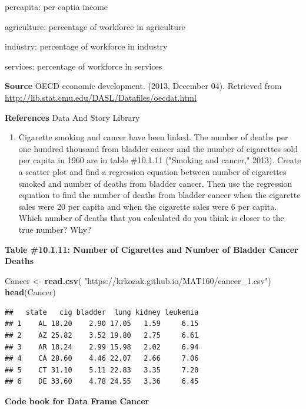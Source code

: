 \documentclass[
]{book}
\newenvironment{Shaded}{\begin{snugshade}}{\end{snugshade}}
\newcommand{\KeywordTok}[1]{\textcolor[rgb]{0.13,0.29,0.53}{\textbf{#1}}}
\newcommand{\NormalTok}[1]{#1}
\newcommand{\StringTok}[1]{\textcolor[rgb]{0.31,0.60,0.02}{#1}}
\providecommand{\tightlist}{%
  \setlength{\itemsep}{0pt}\setlength{\parskip}{0pt}}
\begin{document}
percapita: per captia income

agriculture: percentage of workforce in agriculture

industry: percentage of workforce in industry

services: percentage of workforce in services

\textbf{Source}
OECD economic development. (2013, December 04). Retrieved from
\url{http://lib.stat.cmu.edu/DASL/Datafiles/oecdat.html}

\textbf{References}
Data And Story Library

\begin{enumerate}
\def\labelenumi{\arabic{enumi}.}
\setcounter{enumi}{8}
\tightlist
\item
  Cigarette smoking and cancer have been linked. The number of deaths per one hundred thousand from bladder cancer and the number of cigarettes sold per capita in 1960 are in table \#10.1.11 ("Smoking and cancer," 2013). Create a scatter plot and find a regression equation between number of cigarettes smoked and number of deaths from bladder cancer. Then use the regression equation to find the number of deaths from bladder cancer when the cigarette sales were 20 per capita and when the cigarette sales were 6 per capita. Which number of deaths that you calculated do you think is closer to the true number? Why?
\end{enumerate}

\textbf{Table \#10.1.11: Number of Cigarettes and Number of Bladder Cancer Deaths}

\begin{Shaded}
\begin{Highlighting}[]
\NormalTok{Cancer <-}\StringTok{ }\KeywordTok{read.csv}\NormalTok{(}
  \StringTok{"https://krkozak.github.io/MAT160/cancer_1.csv"}\NormalTok{)}
\KeywordTok{head}\NormalTok{(Cancer)}
\end{Highlighting}
\end{Shaded}

\begin{verbatim}
##   state   cig bladder  lung kidney leukemia
## 1    AL 18.20    2.90 17.05   1.59     6.15
## 2    AZ 25.82    3.52 19.80   2.75     6.61
## 3    AR 18.24    2.99 15.98   2.02     6.94
## 4    CA 28.60    4.46 22.07   2.66     7.06
## 5    CT 31.10    5.11 22.83   3.35     7.20
## 6    DE 33.60    4.78 24.55   3.36     6.45
\end{verbatim}

\textbf{Code book for Data Frame Cancer}
\end{document}
